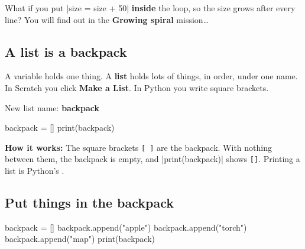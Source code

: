 What if you put \py|size = size + 50| \textbf{inside} the loop, so the size grows after every line? You will find out in the \textbf{Growing spiral} mission\ldots

\subsection*{A list is a backpack}

A variable holds one thing. A \textbf{list} holds lots of things, in order, under one name. In Scratch you click \textbf{Make a List}. In Python you write square brackets.

\begin{tcbraster}[raster columns=2, raster equal height=rows, raster column skip=12pt, raster valign=center]
\begin{tcolorbox}[colback=white, colframe=white, boxrule=0pt, valign=center, halign=center]
\par\medskip
New list name: \textbf{backpack}
\end{tcolorbox}
\begin{code}
backpack = []
print(backpack)
\end{code}
\end{tcbraster}

\textbf{How it works:} The square brackets \texttt{[ ]} are the backpack. With nothing between them, the backpack is empty, and \py|print(backpack)| shows \texttt{[]}. Printing a list is Python's .

\subsection*{Put things in the backpack}

\begin{tcbraster}[raster columns=2, raster equal height=rows, raster column skip=12pt, raster valign=center]
\begin{tcolorbox}[colback=white, colframe=white, boxrule=0pt, valign=center]
\begin{scratch}
\end{scratch}
\end{tcolorbox}
\begin{code}
backpack = []
backpack.append("apple")
backpack.append("torch")
backpack.append("map")
print(backpack)
\end{code}
\end{tcbraster}

